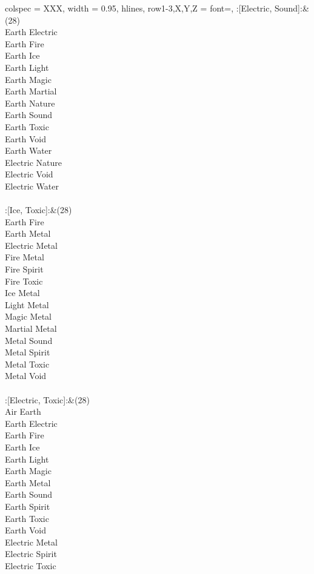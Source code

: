 \begin{longtblr}[
	caption = {2v2 Defending Resisted},
	label = {2v2-Defending-Resisted},
]{
	colspec = {XXX}, width = 0.95\linewidth,
	hlines,
	row{1-3,X,Y,Z} = {font=\bfseries},
}
	:[Electric, Sound]:&{(28)\\
	Earth Electric \\
	Earth Fire \\
	Earth Ice \\
	Earth Light \\
	Earth Magic \\
	Earth Martial \\
	Earth Nature \\
	Earth Sound \\
	Earth Toxic \\
	Earth Void \\
	Earth Water \\
	Electric Nature \\
	Electric Void \\
	Electric Water \\
	}\\

	:[Ice, Toxic]:&{(28)\\
	Earth Fire \\
	Earth Metal \\
	Electric Metal \\
	Fire Metal \\
	Fire Spirit \\
	Fire Toxic \\
	Ice Metal \\
	Light Metal \\
	Magic Metal \\
	Martial Metal \\
	Metal Sound \\
	Metal Spirit \\
	Metal Toxic \\
	Metal Void \\
	}\\

	:[Electric, Toxic]:&{(28)\\
	Air Earth \\
	Earth Electric \\
	Earth Fire \\
	Earth Ice \\
	Earth Light \\
	Earth Magic \\
	Earth Metal \\
	Earth Sound \\
	Earth Spirit \\
	Earth Toxic \\
	Earth Void \\
	Electric Metal \\
	Electric Spirit \\
	Electric Toxic \\
	}\\


\end{longtblr}
